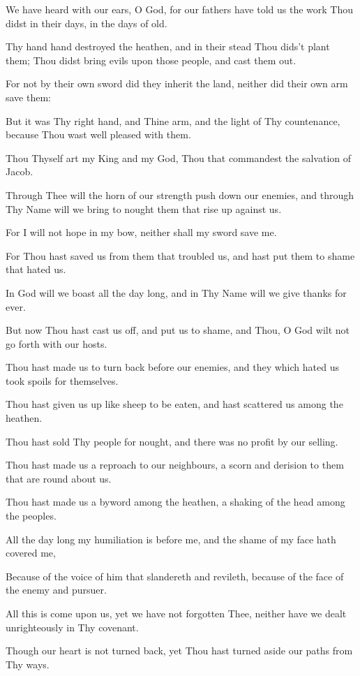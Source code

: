 We have heard with our ears, O God, for our fathers have told us the work Thou didst in their days, in the days of old.

Thy hand hand destroyed the heathen, and in their stead Thou dids't plant them; Thou didst bring evils upon those people, and cast them out.

For not by their own sword did they inherit the land, neither did their own arm save them:

But it was Thy right hand, and Thine arm, and the light of Thy countenance, because Thou wast well pleased with them.

Thou Thyself art my King and my God, Thou that commandest the salvation of Jacob.

Through Thee will the horn of our strength push down our enemies, and through Thy Name will we bring to nought them that rise up against us.

For I will not hope in my bow, neither shall my sword save me.

For Thou hast saved us from them that troubled us, and hast put them to shame that hated us.

In God will we boast all the day long, and in Thy Name will we give thanks for ever.

But now Thou hast cast us off, and put us to shame, and Thou, O God wilt not go forth with our hosts.

Thou hast made us to turn back before our enemies, and they which hated us took spoils for themselves.

Thou hast given us up like sheep to be eaten, and hast scattered us among the heathen.

Thou hast sold Thy people for nought, and there was no profit by our selling.

Thou hast made us a reproach to our neighbours, a scorn and derision to them that are round about us.

Thou hast made us a byword among the heathen, a shaking of the head among the peoples.

All the day long my humiliation is before me, and the shame of my face hath covered me,

Because of the voice of him that slandereth and revileth, because of the face of the enemy and pursuer.

All this is come upon us, yet we have not forgotten Thee, neither have we dealt unrighteously in Thy covenant.

Though our heart is not turned back, yet Thou hast turned aside our paths from Thy ways.

